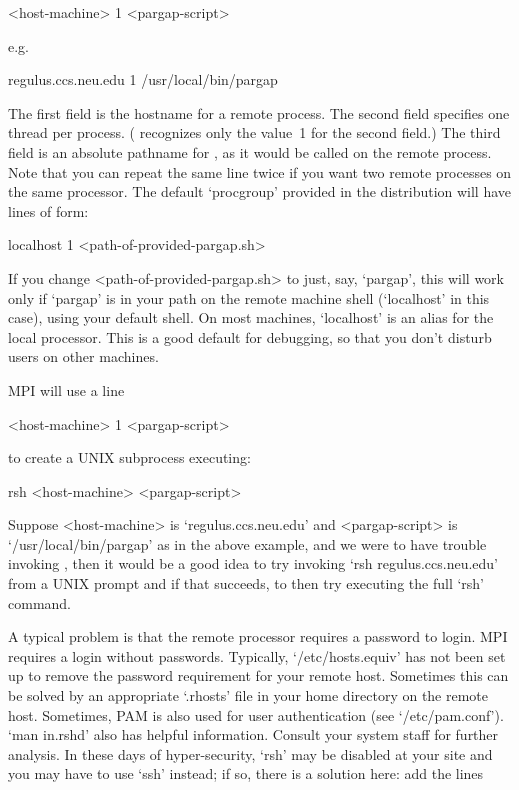 <host-machine> 1 <pargap-script>

e.g.

\begintt
regulus.ccs.neu.edu 1 /usr/local/bin/pargap
\endtt

The first field is the hostname for a remote process.  The  second  field
specifies one thread per process. ({\ParGAP} recognizes only the  value~1
for the second field.) The  third  field  is  an  absolute  pathname  for
{\ParGAP}, as it would be called on the remote process. Note that you can
repeat the same line twice if you want two remote {\ParGAP} processes  on
the same processor. The default `procgroup' provided in the  distribution
will have lines of form:

localhost 1 <path-of-provided-pargap.sh>

If you change <path-of-provided-pargap.sh> to just, say,  `pargap',  this
will work only if `pargap' is in your path on the  remote  machine  shell
(`localhost' in this case), using your default shell. On  most  machines,
`localhost' is an alias for the local processor. This is a  good  default
for debugging, so that you don't disturb users on other machines.

MPI will use a line

<host-machine> 1 <pargap-script>

to create a UNIX subprocess executing:

rsh <host-machine> <pargap-script>

Suppose <host-machine> is `regulus.ccs.neu.edu'  and  <pargap-script>  is
`/usr/local/bin/pargap' as in the above example,  and  we  were  to  have
trouble invoking {\ParGAP}, then it would be a good idea to try  invoking
`rsh regulus.ccs.neu.edu' from a UNIX prompt and  if  that  succeeds,  to
then try executing the full `rsh' command.

A typical problem is that the remote processor  requires  a  password  to
login.   MPI   requires   a   login   without    passwords.    Typically,
`/etc/hosts.equiv' has not been set up to remove the password requirement
for your remote host. Sometimes this can  be  solved  by  an  appropriate
`.rhosts' file in your home directory on the remote host. Sometimes,  PAM
is also used for user authentication (see `/etc/pam.conf'). `man in.rshd'
also has helpful information.  Consult  your  system  staff  for  further
analysis. In these days of hyper-security, `rsh' may be disabled at  your
site and you may have to use `ssh' instead; if so, there  is  a  solution
here: add the lines

